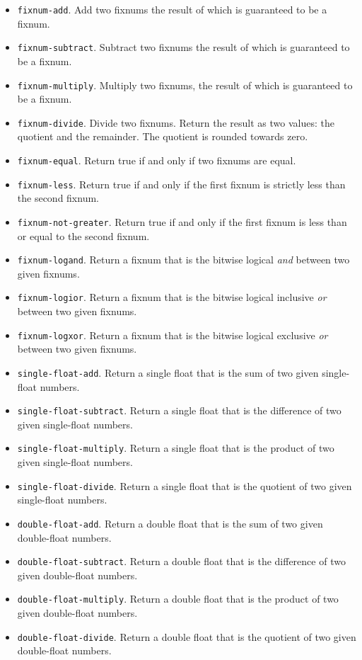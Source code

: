 \begin{itemize}
\item \texttt{fixnum-add}.  Add two fixnums the result of which is
  guaranteed to be a fixnum.
\item \texttt{fixnum-subtract}.  Subtract two fixnums the result of
  which is guaranteed to be a fixnum.
\item \texttt{fixnum-multiply}.  Multiply two fixnums, the result of
  which is guaranteed to be a fixnum.
\item \texttt{fixnum-divide}.  Divide two fixnums.  Return the result
  as two values: the quotient and the remainder.  The quotient is
  rounded towards zero.
\item \texttt{fixnum-equal}.  Return true if and only if two fixnums
  are equal.
\item \texttt{fixnum-less}.  Return true if and only if the first
  fixnum is strictly less than the second fixnum.
\item \texttt{fixnum-not-greater}.  Return true if and only if the first
  fixnum is less than or equal to the second fixnum.
\item \texttt{fixnum-logand}.  Return a fixnum that is the bitwise
  logical \emph{and} between two given fixnums.
\item \texttt{fixnum-logior}.  Return a fixnum that is the bitwise
  logical inclusive \emph{or} between two given fixnums.
\item \texttt{fixnum-logxor}.  Return a fixnum that is the bitwise
  logical exclusive \emph{or} between two given fixnums.
\item \texttt{single-float-add}.  Return a single float that is the
sum of two given single-float numbers.
\item \texttt{single-float-subtract}.  Return a single float that is
  the difference of two given single-float numbers.
\item \texttt{single-float-multiply}.  Return a single float that is
  the product of two given single-float numbers.
\item \texttt{single-float-divide}.  Return a single float that is
  the quotient of two given single-float numbers.
\item \texttt{double-float-add}.  Return a double float that is the
sum of two given double-float numbers.
\item \texttt{double-float-subtract}.  Return a double float that is
  the difference of two given double-float numbers.
\item \texttt{double-float-multiply}.  Return a double float that is
  the product of two given double-float numbers.
\item \texttt{double-float-divide}.  Return a double float that is
  the quotient of two given double-float numbers.
\end{itemize}


